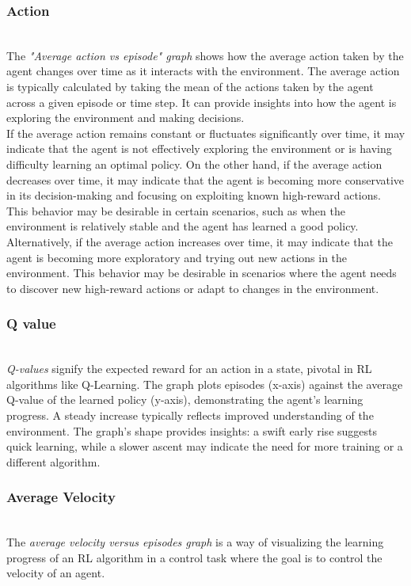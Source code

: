 \documentclass[preprint,12pt]{elsarticle}
\begin{document}
\subsubsection{Action}\\
The \textit{"Average action vs episode" graph} shows how the average action taken by the agent changes over time as it interacts with the environment. The average action is typically calculated by taking the mean of the actions taken by the agent across a given episode or time step. It can provide insights into how the agent is exploring the environment and making decisions.\\
If the average action remains constant or fluctuates significantly over time, it may indicate that the agent is not effectively exploring the environment or is having difficulty learning an optimal policy.
On the other hand, if the average action decreases over time, it may indicate that the agent is becoming more conservative in its decision-making and focusing on exploiting known high-reward actions. This behavior may be desirable in certain scenarios, such as when the environment is relatively stable and the agent has learned a good policy.\\
Alternatively, if the average action increases over time, it may indicate that the agent is becoming more exploratory and trying out new actions in the environment. This behavior may be desirable in scenarios where the agent needs to discover new high-reward actions or adapt to changes in the environment.\\

\subsubsection{Q value}\\
\textit{Q-values} signify the expected reward for an action in a state, pivotal in RL algorithms like Q-Learning. The graph plots episodes (x-axis) against the average Q-value of the learned policy (y-axis), demonstrating the agent's learning progress. A steady increase typically reflects improved understanding of the environment. The graph's shape provides insights: a swift early rise suggests quick learning, while a slower ascent may indicate the need for more training or a different algorithm.

\subsubsection{Average Velocity}\\
The \textit{average velocity versus episodes graph} is a way of visualizing the learning progress of an RL algorithm in a control task where the goal is to control the velocity of an agent. \\
\end{document}
